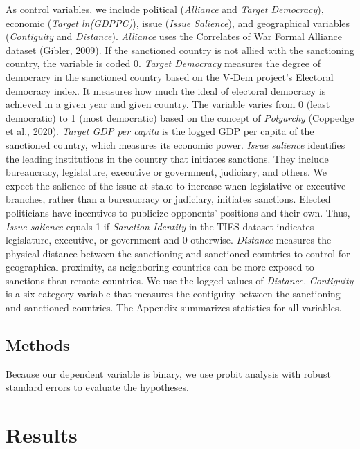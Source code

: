 \documentclass[
  english,
  man]{apa6}
\begin{document}
As control variables, we include political (\emph{Alliance} and \emph{Target Democracy}), economic (\emph{Target ln(GDPPC)}), issue (\emph{Issue Salience}), and geographical variables (\emph{Contiguity} and \emph{Distance}). \emph{Alliance} uses the Correlates of War Formal Alliance dataset (Gibler, 2009). If the sanctioned country is not allied with the sanctioning country, the variable is coded 0. \emph{Target Democracy} measures the degree of democracy in the sanctioned country based on the V-Dem project's Electoral democracy index. It measures how much the ideal of electoral democracy is achieved in a given year and given country. The variable varies from 0 (least democratic) to 1 (most democratic) based on the concept of \emph{Polyarchy} (Coppedge et al., 2020). \emph{Target GDP per capita} is the logged GDP per capita of the sanctioned country, which measures its economic power. \emph{Issue salience} identifies the leading institutions in the country that initiates sanctions. They include bureaucracy, legislature, executive or government, judiciary, and others. We expect the salience of the issue at stake to increase when legislative or executive branches, rather than a bureaucracy or judiciary, initiates sanctions. Elected politicians have incentives to publicize opponents' positions and their own. Thus, \emph{Issue salience} equals 1 if \emph{Sanction Identity} in the TIES dataset indicates legislature, executive, or government and 0 otherwise. \emph{Distance} measures the physical distance between the sanctioning and sanctioned countries to control for geographical proximity, as neighboring countries can be more exposed to sanctions than remote countries. We use the logged values of \emph{Distance.} \emph{Contiguity} is a six-category variable that measures the contiguity between the sanctioning and sanctioned countries. The Appendix summarizes statistics for all variables.

\hypertarget{methods}{%
\subsection{Methods}\label{methods}}

Because our dependent variable is binary, we use probit analysis with robust standard errors to evaluate the hypotheses.

\hypertarget{results}{%
\section{Results}\label{results}}
\end{document}
